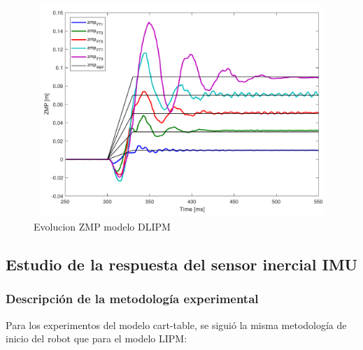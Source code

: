 






\begin{figure}[H]
\centering
\includegraphics[width=13cm, height=8cm]{imagenes/apartado_5/5.1/figura4.pdf}
\caption{Evolucion ZMP modelo DLIPM}
\label{figura55}
\end{figure}

\subsection{Estudio de la respuesta del sensor inercial IMU}\label{respuestaIMU}

\subsubsection{Descripción de la metodología experimental}

Para los experimentos del modelo cart-table, se siguió la misma metodología de inicio del robot que para el modelo LIPM:

